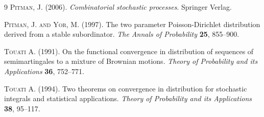 \documentclass[twoside,12pt]{article}
\begin{document}
\begin{thebibliography}{9}
\textsc{Pitman, J.} (2006). \textit{Combinatorial stochastic processes}. Springer Verlag.

\textsc{Pitman, J. and Yor, M.} (1997). The two parameter Poisson-Dirichlet distribution derived from a stable subordinator. \textit{The Annals of Probability} \textbf{25}, 855--900.

\textsc{Touati A.} (1991). On the functional convergence in distribution of sequences of semimartingales to a mixture of Brownian motions. \textit{Theory of Probability and its Applications}
\textbf{36}, 752--771.

\textsc{Touati A.} (1994). Two theorems on convergence in distribution for stochastic integrals and statistical applications. \textit{Theory of Probability and its Applications} \textbf{38}, 95--117.

\end{thebibliography}
\end{document}
